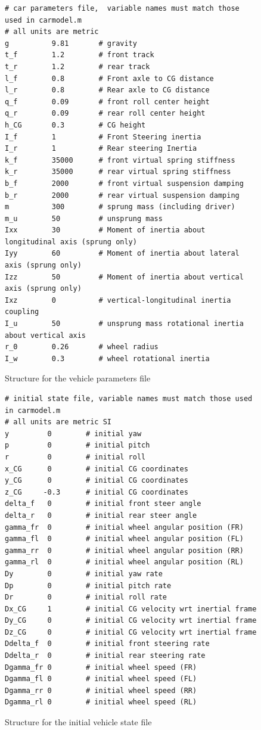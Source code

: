 \begin{figure}[ht]
\begin{verbatim}
# car parameters file,  variable names must match those used in carmodel.m
# all units are metric
g          9.81       # gravity
t_f        1.2        # front track
t_r        1.2        # rear track
l_f        0.8        # Front axle to CG distance
l_r        0.8        # Rear axle to CG distance
q_f        0.09       # front roll center height
q_r        0.09       # rear roll center height
h_CG       0.3        # CG height
I_f        1          # Front Steering inertia
I_r        1          # Rear steering Inertia
k_f        35000      # front virtual spring stiffness
k_r        35000      # rear virtual spring stiffness
b_f        2000       # front virtual suspension damping
b_r        2000       # rear virtual suspension damping
m          300        # sprung mass (including driver)
m_u        50         # unsprung mass
Ixx        30         # Moment of inertia about longitudinal axis (sprung only)
Iyy        60         # Moment of inertia about lateral axis (sprung only)
Izz        50         # Moment of inertia about vertical axis (sprung only)
Ixz        0          # vertical-longitudinal inertia coupling
I_u        50         # unsprung mass rotational inertia about vertical axis
r_0        0.26       # wheel radius
I_w        0.3        # wheel rotational inertia
\end{verbatim}
\caption{Structure for the vehicle parameters file}
\label{params}
\end{figure}

\begin{figure}[ht]
\begin{verbatim}
# initial state file, variable names must match those used in carmodel.m
# all units are metric SI
y         0        # initial yaw
p         0        # initial pitch
r         0        # initial roll
x_CG      0        # initial CG coordinates
y_CG      0        # initial CG coordinates
z_CG     -0.3      # initial CG coordinates
delta_f   0        # initial front steer angle
delta_r   0        # initial rear steer angle
gamma_fr  0        # initial wheel angular position (FR)
gamma_fl  0        # initial wheel angular position (FL)
gamma_rr  0        # initial wheel angular position (RR)
gamma_rl  0        # initial wheel angular position (RL)
Dy        0        # initial yaw rate
Dp        0        # initial pitch rate
Dr        0        # initial roll rate
Dx_CG     1        # initial CG velocity wrt inertial frame
Dy_CG     0        # initial CG velocity wrt inertial frame
Dz_CG     0        # initial CG velocity wrt inertial frame
Ddelta_f  0        # initial front steering rate
Ddelta_r  0        # initial rear steering rate
Dgamma_fr 0        # initial wheel speed (FR)
Dgamma_fl 0        # initial wheel speed (FL)
Dgamma_rr 0        # initial wheel speed (RR)
Dgamma_rl 0        # initial wheel speed (RL)
\end{verbatim}
\caption{Structure for the initial vehicle state file}
\label{init}
\end{figure}

